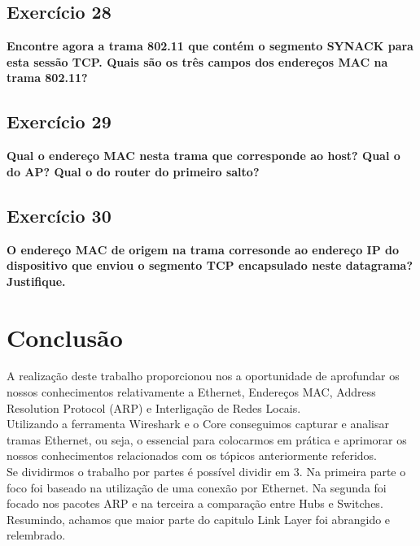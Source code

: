 \documentclass[a4paper]{report}
\begin{document}
\section{Exercício 28}
\textbf{Encontre agora a trama 802.11 que contém o segmento SYNACK para esta
    sessão TCP. Quais são os três campos dos endereços MAC na trama 802.11?}\\

\section{Exercício 29}
\textbf{Qual o endereço MAC nesta trama que corresponde ao host? Qual o do AP?
    Qual o do router do primeiro salto?}\\

\section{Exercício 30}
\textbf{O endereço MAC de origem na trama corresonde ao endereço IP do
    dispositivo que enviou o segmento TCP encapsulado neste datagrama?
    Justifique.}\\

\chapter{Conclusão}
A realização deste trabalho proporcionou nos a oportunidade de aprofundar os
nossos conhecimentos relativamente a Ethernet, Endereços MAC, Address Resolution
Protocol (ARP) e Interligação de Redes Locais.\\
Utilizando a ferramenta Wireshark e o Core conseguimos capturar e analisar
tramas Ethernet, ou seja, o essencial para colocarmos em prática e aprimorar os
nossos conhecimentos relacionados com os tópicos anteriormente referidos.\\
Se dividirmos o trabalho por partes é possível dividir em 3. Na primeira parte o
foco foi baseado na utilização de uma conexão por Ethernet. Na segunda foi
focado nos pacotes ARP e na terceira a comparação entre Hubs e Switches.
Resumindo, achamos que maior parte do capitulo Link Layer foi abrangido e
relembrado.
\end{document}
